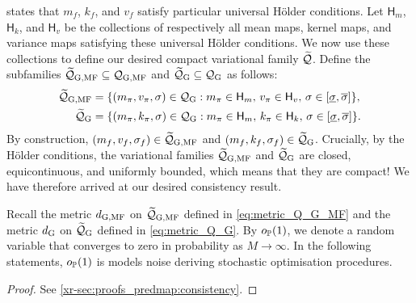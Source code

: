 \documentclass[12pt, twoside]{report}
\newcommand{\xrprefix}[1]{xr-#1}
\begin{document}
 states that $m_f$, $k_f$, and $v_f$ satisfy particular universal H\"older conditions.
Let $\mathsf{H}_m$, $\mathsf{H}_k$, and $\mathsf{H}_v$ be the collections of respectively all mean maps, kernel maps, and variance maps satisfying these universal H\"older conditions.
We now use these collections to define our desired compact variational family $\widetilde{\Qc}$.
Define the subfamilies $\widetilde\Qc\ss{G,MF} \sub \Qc\ss{G,MF}$ and $\widetilde\Qc\ss{G} \sub \Qc\ss{G}$ as follows:
\begin{align}
    \widetilde\Qc\ss{G,MF} &= \set*{
        (m_\pi, v_\pi, \sigma) \in \Qc\ss{G} :
            m_\pi \in \mathsf{H}_m,\,
            v_\pi \in \mathsf{H}_v,\,
            \sigma \in [\underline{\sigma}, \overline{\sigma}]
    }, \\
    \widetilde\Qc\ss{G} &= \set*{
        (m_\pi, k_\pi, \sigma) \in \Qc\ss{G} :
            m_\pi \in \mathsf{H}_m,\,
            k_\pi \in \mathsf{H}_k,\,
            \sigma \in [\underline{\sigma}, \overline{\sigma}]
    }.
\end{align}
By construction, $(m_f, v_f, \sigma_f) \in \widetilde\Qc\ss{G,MF}$ and $(m_f, k_f, \sigma_f) \in \widetilde\Qc\ss{G}$.
Crucially, by the H\"older conditions, the variational families $\widetilde\Qc\ss{G,MF}$ and $\widetilde\Qc\ss{G}$ are closed, equicontinuous, and uniformly bounded, which means that they are compact!
We have therefore arrived at our desired consistency result.

Recall the metric $d\ss{G,MF}$ on $\widetilde\Qc\ss{G,MF}$ defined in \eqref{eq:metric_Q_G_MF}
and the metric $d\ss{G}$ on $\widetilde\Qc\ss{G}$ defined in \eqref{eq:metric_Q_G}.
By $o_\P(1)$, we denote a random variable that converges to zero in probability as $M \to \infty$.
In the following statements, $o_\P(1)$ is models noise deriving stochastic optimisation procedures.

\begin{proof}
    See \cref{\xrprefix{sec:proofs_predmap:consistency}}.
\end{proof}
\end{document}
